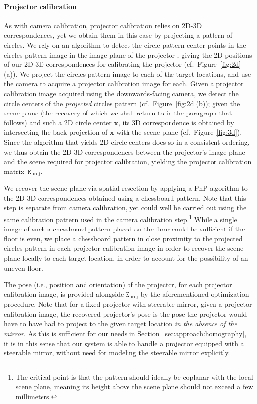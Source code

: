 \documentclass[review]{elsarticle}
\begin{document}
\paragraph{Projector calibration} As with camera calibration, projector calibration relies on 2D-3D correspondences, yet we obtain them in this case by projecting a pattern of circles. We rely on an algorithm to detect the circle pattern center points in the circles pattern image in the image plane of the projector \cite{bradski2000opencv}, giving the 2D positions of our 2D-3D correspondences for calibrating the projector (cf.\ Figure~\ref{fig:2d}(a)). We project the circles pattern image to each of the target locations, and use the camera to acquire a projector calibration image for each. Given a projector calibration image acquired using the downwards-facing camera, we detect the circle centers of the \textit{projected} circles pattern (cf.\ Figure~\ref{fig:2d}(b)); given the scene plane (the recovery of which we shall return to in the paragraph that follows) and such a 2D circle center $\mathbf{x}$, its 3D correspondence is obtained by intersecting the back-projection of $\mathbf{x}$ with the scene plane (cf.\ Figure~\ref{fig:3d}). Since the algorithm that yields 2D circle centers does so in a consistent ordering, we thus obtain the 2D-3D correspondences between the projector's image plane and the scene required for projector calibration, yielding the projector calibration matrix~$\mathtt{K}_\text{proj}$.

We recover the scene plane via spatial resection by applying a PnP algorithm \cite{terzakis2020consistently} to the 2D-3D correspondences obtained using a chessboard pattern. Note that this step is separate from camera calibration, yet could well be carried out using the same calibration pattern used in the camera calibration step.\footnote{The critical point is that the pattern should ideally be coplanar with the local scene plane, meaning its height above the scene plane should not exceed a few millimeters.} While a single image of such a chessboard pattern placed on the floor could be sufficient if the floor is even, we place a chessboard pattern in close proximity to the projected circles pattern in each projector calibration image in order to recover the scene plane locally to each target location, in order to account for the possibility of an uneven floor.

The pose (i.e., position and orientation) of the projector, for each projector calibration image, is provided alongside $\mathtt{K}_\text{proj}$ by the aforementioned optimization procedure. Note that for a fixed projector with steerable mirror, given a projector calibration image, the recovered projector's pose is the pose the projector would have to have had to project to the given target location \textit{in the absence of the mirror}. As this is sufficient for our needs in Section~\ref{sec:approach:homography}, it is in this sense that our system is able to handle a projector equipped with a steerable mirror, without need for modeling the steerable mirror explicitly.
\end{document}
